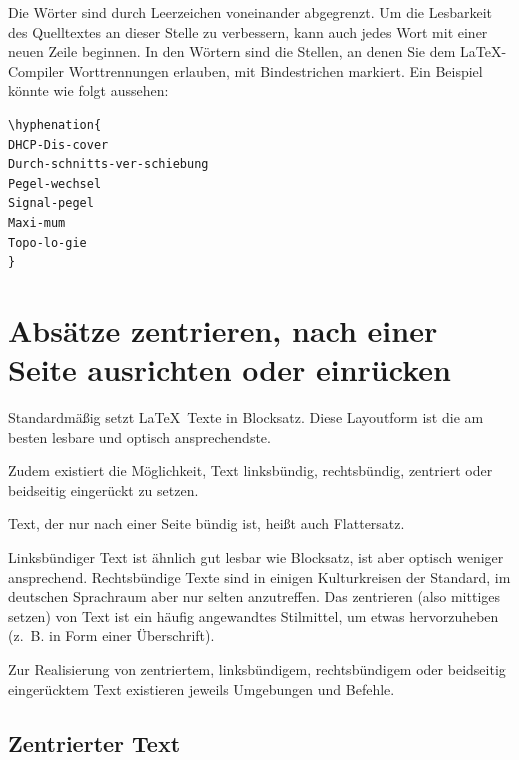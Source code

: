 \documentclass[a4paper,10pt,twoside]{scrbook}
\begin{document}
Die Wörter sind durch Leerzeichen voneinander abgegrenzt. 
Um die Lesbarkeit des Quelltextes an dieser Stelle zu verbessern, kann auch jedes Wort mit einer neuen Zeile beginnen.
In den Wörtern sind die Stellen, an denen Sie dem \LaTeX-Compiler Worttrennungen erlauben, mit Bindestrichen markiert.
Ein Beispiel könnte wie folgt aussehen:

\begin{Verbatim}[frame=single]
\hyphenation{
DHCP-Dis-cover
Durch-schnitts-ver-schiebung 
Pegel-wechsel 
Signal-pegel 
Maxi-mum
Topo-lo-gie
}
\end{Verbatim}


\section{Absätze zentrieren, nach einer Seite ausrichten oder einrücken}

Standardmäßig setzt \LaTeX\ Texte in Blocksatz. 
Diese Layoutform ist die am besten lesbare und optisch ansprechendste.

Zudem existiert die Möglichkeit, Text linksbündig, rechtsbündig, zentriert oder beidseitig eingerückt zu setzen. 


Text, der nur nach einer Seite bündig ist, heißt auch Flattersatz.

Linksbündiger Text ist
ähnlich gut lesbar wie Blocksatz, ist aber optisch weniger ansprechend. 
Rechtsbündige Texte sind in einigen Kulturkreisen der Standard, im deutschen Sprachraum aber nur selten anzutreffen.
Das zentrieren (also mittiges setzen) von Text ist ein 
häufig angewandtes Stilmittel, um etwas hervorzuheben (z.~B. in Form einer Überschrift).

Zur Realisierung von zentriertem, linksbündigem,
rechtsbündigem oder beidseitig eingerücktem Text existieren jeweils Umgebungen und Befehle.

\subsection{Zentrierter Text}
\end{document}
